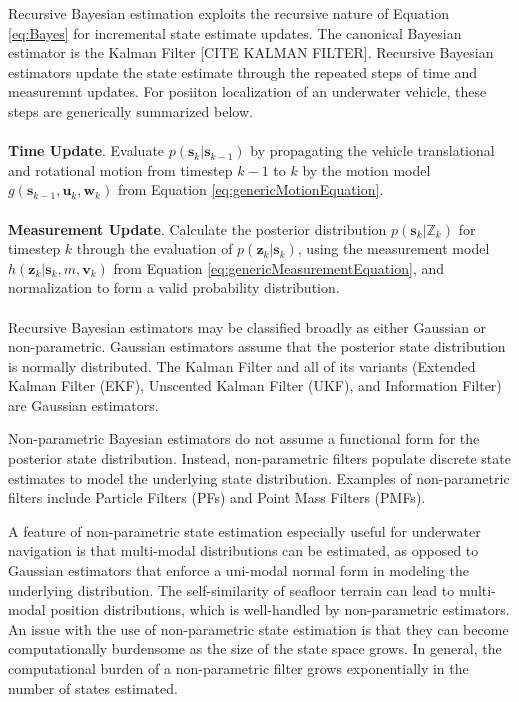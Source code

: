 Recursive Bayesian estimation exploits the recursive nature of Equation \ref{eq:Bayes} for incremental state estimate updates.
The canonical Bayesian estimator is the Kalman Filter [CITE KALMAN FILTER].
Recursive Bayesian estimators update the state estimate through the repeated steps of time and measuremnt updates. 
For posiiton localization of an underwater vehicle, these steps are generically summarized below.
\\ \\
\textbf{Time Update}. Evaluate $p(\mathbf{s}_k | \mathbf{s}_{k-1})$ by propagating the vehicle translational and rotational motion from timestep $k-1$ to $k$ by the motion model $g(\mathbf{s}_{k-1}, \mathbf{u}_k, \mathbf{w}_k)$ from Equation \ref{eq:genericMotionEquation}. 
\\ \\
\textbf{Measurement Update}. Calculate the posterior distribution $p(\textbf{s}_k|\mathbb{Z}_k)$ for timestep $k$ through the evaluation of $p(\mathbf{z}_k | \mathbf{s}_{k})$, using the measurement model $h(\mathbf{z}_k | \mathbf{s}_k, m, \mathbf{v}_k)$ from Equation \ref{eq:genericMeasurementEquation}, and normalization to form a valid probability distribution.
\\ \\
Recursive Bayesian estimators may be classified broadly as either Gaussian or non-parametric.
Gaussian estimators assume that the posterior state distribution is normally distributed.
The Kalman Filter and all of its variants (Extended Kalman Filter (EKF), Unscented Kalman Filter (UKF), and Information Filter) are Gaussian estimators.  

Non-parametric Bayesian estimators do not assume a functional form for the posterior state distribution.
Instead, non-parametric filters populate discrete state estimates to model the underlying state distribution.
Examples of non-parametric filters include Particle Filters (PFs) and Point Mass Filters (PMFs).

A feature of non-parametric state estimation especially useful for underwater navigation is that multi-modal distributions can be estimated, as opposed to Gaussian estimators that enforce a uni-modal normal form in modeling the underlying distribution.
The self-similarity of seafloor terrain can lead to multi-modal position distributions, which is well-handled by non-parametric estimators.
An issue with the use of non-parametric state estimation is that they can become computationally burdensome as the size of the state space grows.
In general, the computational burden of a non-parametric filter grows exponentially in the number of states estimated.

